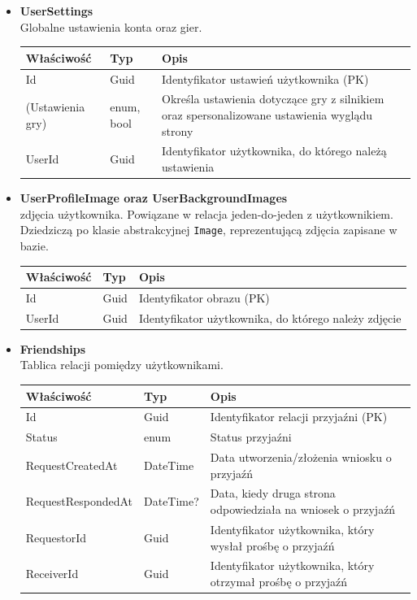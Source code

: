 \documentclass[12pt,a4paper]{article}
\begin{document}
\begin{itemize}
    \item \textbf{UserSettings}\\
    Globalne ustawienia konta oraz gier.
    \renewcommand{\arraystretch}{1.5}
    \begin{longtable}{|m{4cm}|m{2cm}|m{8cm}|}
        \hline
        \rowcolor{lightgray}
        \textbf{Właściwość} & \textbf{Typ} & \textbf{Opis} \\ \hline
        \endhead
        \hline
        Id & Guid & Identyfikator ustawień użytkownika (PK) \\ \hline
        (Ustawienia gry) & enum, bool & Określa ustawienia dotyczące gry z silnikiem oraz spersonalizowane ustawienia wyglądu strony \\ \hline
        UserId & Guid & Identyfikator użytkownika, do którego należą ustawienia \\ \hline
    \end{longtable}

    \item \textbf{UserProfileImage oraz UserBackgroundImages}\\
    zdjęcia użytkownika. Powiązane w relacja jeden-do-jeden z użytkownikiem. Dziedziczą po klasie abstrakcyjnej \texttt{Image}, reprezentującą zdjęcia zapisane w bazie.
    \renewcommand{\arraystretch}{1.5}
    \begin{longtable}{|m{4cm}|m{2cm}|m{8cm}|}
        \hline
        \rowcolor{lightgray}
        \textbf{Właściwość} & \textbf{Typ} & \textbf{Opis} \\ \hline
        \endhead
        \hline
        Id & Guid & Identyfikator obrazu (PK) \\ \hline
        UserId & Guid & Identyfikator użytkownika, do którego należy zdjęcie \\ \hline
    \end{longtable}

\newpage

    \item \textbf{Friendships}\\
    Tablica relacji pomiędzy użytkownikami.
    \renewcommand{\arraystretch}{1.5}
    \begin{longtable}{|m{4cm}|m{2cm}|m{8cm}|}
        \hline
        \rowcolor{lightgray}
        \textbf{Właściwość} & \textbf{Typ} & \textbf{Opis} \\ \hline
        \endhead
        \hline
        Id & Guid & Identyfikator relacji przyjaźni (PK) \\ \hline
        Status & enum & Status przyjaźni  \\ \hline
        RequestCreatedAt & DateTime & Data utworzenia/złożenia wniosku o przyjaźń \\ \hline
        RequestRespondedAt & DateTime? & Data, kiedy druga strona odpowiedziała na wniosek o przyjaźń \\ \hline
        RequestorId & Guid & Identyfikator użytkownika, który wysłał prośbę o przyjaźń \\ \hline
        ReceiverId & Guid & Identyfikator użytkownika, który otrzymał prośbę o przyjaźń \\ \hline
    \end{longtable}


\end{itemize}
\end{document}
